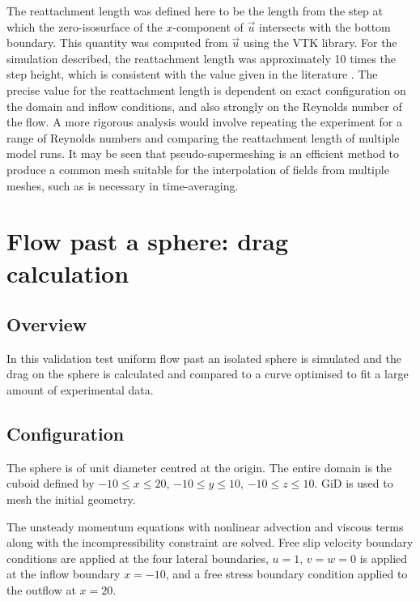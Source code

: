 The reattachment length was defined here to be the length
from the step at which the zero-isosurface of the $x$-component of $\vec{u}$ intersects with
the bottom boundary. This quantity was computed from $\vec{u}$
using the VTK library. For the simulation described, the reattachment
length was approximately 10 times the step height, which is consistent with the value
given in the literature \cite{le1997}.
The precise value for the reattachment length is dependent on exact configuration on the domain and inflow
conditions, and also strongly on the Reynolds number of the flow.
A more rigorous analysis would involve
repeating the experiment for a range of Reynolds numbers and comparing the reattachment
length of multiple model runs. It may be seen that pseudo-supermeshing is an efficient
method to produce a common mesh suitable for the interpolation of fields from multiple
meshes, such as is necessary in time-averaging.



\section{Flow past a sphere: drag calculation}
\label{sect:flow_past_sphere}
\subsection{Overview}
In this validation test uniform flow past an isolated sphere is simulated
and the drag on the sphere is calculated and compared to a curve optimised
to fit a large amount of experimental data.

\subsection{Configuration}
The sphere is of unit diameter centred at the origin. The entire domain is
the cuboid defined by $-10\le x\le 20$, $-10\le y\le 10$, $-10\le z\le 10$.
GiD is used to mesh the initial geometry.

The unsteady momentum equations with nonlinear advection and viscous terms
along with the incompressibility constraint are solved. Free slip velocity
boundary conditions are applied at the four lateral boundaries, $u=1$, $v=w=0$ is
applied at the inflow boundary $x=-10$, and a free stress boundary condition
applied to the outflow at $x=20$. 

